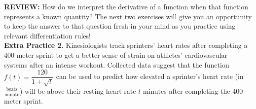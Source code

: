 \documentclass[10pt]{article}
\begin{document}
\vfill

\newpage%

{\bf REVIEW:} How do we interpret the derivative of a function when that function represents a known quantity? The next two exercises will give you an opportunity to keep the answer to that question fresh in your mind as you practice using relevant differentiation rules!\\

{\bf\color{blue}Extra Practice 2.} %
Kinesiologists track sprinters' heart rates after completing a $400$ meter sprint to get a better sense of strain on athletes' cardiovascular systems after an intense workout. Collected data suggest that the function $f(t)=\dfrac{120}{1+\sqrt{t}}$ can be used to predict how elevated a sprinter's heart rate (in $\frac{\text{beats}}{\text{minute}}$) will be above their resting heart rate $t$ minutes after completing the $400$ meter sprint.
\end{document}
